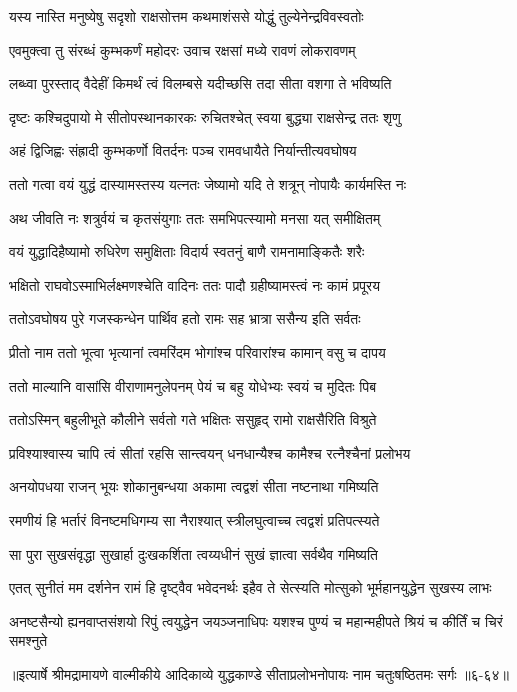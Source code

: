 \twolineshloka
{यस्य नास्ति मनुष्येषु सदृशो राक्षसोत्तम}
{कथमाशंससे योद्धुं तुल्येनेन्द्रविवस्वतोः} %

\twolineshloka
{एवमुक्त्वा तु संरब्धं कुम्भकर्णं महोदरः}
{उवाच रक्षसां मध्ये रावणं लोकरावणम्} %

\twolineshloka
{लब्ध्वा पुरस्ताद् वैदेहीं किमर्थं त्वं विलम्बसे}
{यदीच्छसि तदा सीता वशगा ते भविष्यति} %

\twolineshloka
{दृष्टः कश्चिदुपायो मे सीतोपस्थानकारकः}
{रुचितश्चेत् स्वया बुद्ध्या राक्षसेन्द्र ततः शृणु} %

\twolineshloka
{अहं द्विजिह्वः संह्रादी कुम्भकर्णो वितर्दनः}
{पञ्च रामवधायैते निर्यान्तीत्यवघोषय} %

\twolineshloka
{ततो गत्वा वयं युद्धं दास्यामस्तस्य यत्नतः}
{जेष्यामो यदि ते शत्रून् नोपायैः कार्यमस्ति नः} %

\twolineshloka
{अथ जीवति नः शत्रुर्वयं च कृतसंयुगाः}
{ततः समभिपत्स्यामो मनसा यत् समीक्षितम्} %

\twolineshloka
{वयं युद्धादिहैष्यामो रुधिरेण समुक्षिताः}
{विदार्य स्वतनुं बाणै रामनामाङ्कितैः शरैः} %

\twolineshloka
{भक्षितो राघवोऽस्माभिर्लक्ष्मणश्चेति वादिनः}
{ततः पादौ ग्रहीष्यामस्त्वं नः कामं प्रपूरय} %

\twolineshloka
{ततोऽवघोषय पुरे गजस्कन्धेन पार्थिव}
{हतो रामः सह भ्रात्रा ससैन्य इति सर्वतः} %

\twolineshloka
{प्रीतो नाम ततो भूत्वा भृत्यानां त्वमरिंदम}
{भोगांश्च परिवारांश्च कामान् वसु च दापय} %

\twolineshloka
{ततो माल्यानि वासांसि वीराणामनुलेपनम्}
{पेयं च बहु योधेभ्यः स्वयं च मुदितः पिब} %

\twolineshloka
{ततोऽस्मिन् बहुलीभूते कौलीने सर्वतो गते}
{भक्षितः ससुहृद् रामो राक्षसैरिति विश्रुते} %

\twolineshloka
{प्रविश्याश्वास्य चापि त्वं सीतां रहसि सान्त्वयन्}
{धनधान्यैश्च कामैश्च रत्नैश्चैनां प्रलोभय} %

\twolineshloka
{अनयोपधया राजन् भूयः शोकानुबन्धया}
{अकामा त्वद्वशं सीता नष्टनाथा गमिष्यति} %

\twolineshloka
{रमणीयं हि भर्तारं विनष्टमधिगम्य सा}
{नैराश्यात् स्त्रीलघुत्वाच्च त्वद्वशं प्रतिपत्स्यते} %

\twolineshloka
{सा पुरा सुखसंवृद्धा सुखार्हा दुःखकर्शिता}
{त्वय्यधीनं सुखं ज्ञात्वा सर्वथैव गमिष्यति} %

\twolineshloka
{एतत् सुनीतं मम दर्शनेन रामं हि दृष्ट्वैव भवेदनर्थः}
{इहैव ते सेत्स्यति मोत्सुको भूर्महानयुद्धेन सुखस्य लाभः} %

\twolineshloka
{अनष्टसैन्यो ह्यनवाप्तसंशयो रिपुं त्वयुद्धेन जयञ्जनाधिपः}
{यशश्च पुण्यं च महान्महीपते श्रियं च कीर्तिं च चिरं समश्नुते} %


॥इत्यार्षे श्रीमद्रामायणे वाल्मीकीये आदिकाव्ये युद्धकाण्डे सीताप्रलोभनोपायः नाम चतुःषष्ठितमः सर्गः ॥६-६४॥
